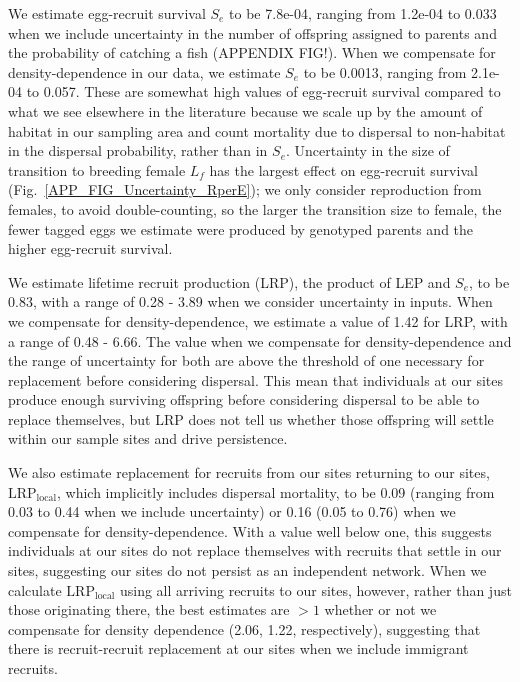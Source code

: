 \documentclass[12pt, oneside]{article}   	%
\begin{document}
We estimate egg-recruit survival $S_e$ to be 7.8e-04, ranging from 1.2e-04 to 0.033 when we include uncertainty in the number of offspring assigned to parents and the probability of catching a fish (APPENDIX FIG!). When we compensate for density-dependence in our data, we estimate $S_e$ to be 0.0013, ranging from 2.1e-04 to 0.057. These are somewhat high values of egg-recruit survival compared to what we see elsewhere in the literature \citep[e.g.][]{rumrill_natural_1990, metaxas_quantifying_2009} \citep[though not unreasonable, e.g.][]{white2014planktonic, johnson2018integrating} because we scale up by the amount of habitat in our sampling area and count mortality due to dispersal to non-habitat in the dispersal probability, rather than in $S_e$. Uncertainty in the size of transition to breeding female $L_f$ has the largest effect on egg-recruit survival (Fig.\ \ref{APP_FIG_Uncertainty_RperE}); we only consider reproduction from females, to avoid double-counting, so the larger the transition size to female, the fewer tagged eggs we estimate were produced by genotyped parents and the higher egg-recruit survival. %

We estimate lifetime recruit production (LRP), the product of LEP and $S_e$, to be 0.83, with a range of 0.28 - 3.89 when we consider uncertainty in inputs. When we compensate for density-dependence, we estimate a value of 1.42 for LRP, with a range of 0.48 - 6.66. The value when we compensate for density-dependence and the range of uncertainty for both are above the threshold of one necessary for replacement before considering dispersal. This mean that individuals at our sites produce enough surviving offspring before considering dispersal to be able to replace themselves, but LRP does not tell us whether those offspring will settle within our sample sites and drive persistence. %

We also estimate replacement for recruits from our sites returning to our sites,  $\text{LRP}_\text{local}$, which implicitly includes dispersal mortality, to be 0.09 (ranging from 0.03 to 0.44 when we include uncertainty) or 0.16 (0.05 to 0.76) when we compensate for density-dependence. With a value well below one, this suggests individuals at our sites do not replace themselves with recruits that settle in our sites, suggesting our sites do not persist as an independent network. When we calculate $\text{LRP}_\text{local}$ using all arriving recruits to our sites, however, rather than just those originating there, the best estimates are $> 1$ whether or not we compensate for density dependence (2.06, 1.22, respectively), suggesting that there is recruit-recruit replacement at our sites when we include immigrant recruits.
\end{document}
